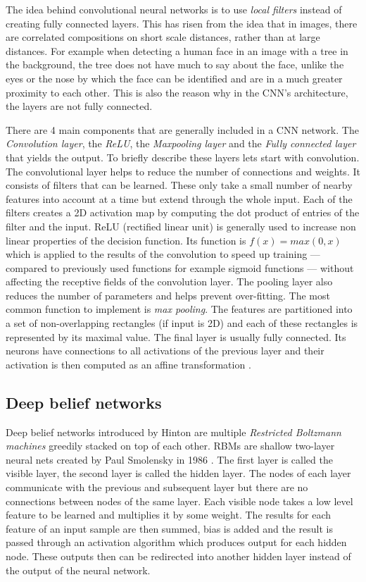The idea behind convolutional neural networks is to use \textit{local filters} instead of creating fully connected layers. This has risen from the idea that in images, there are correlated compositions on short scale distances, rather than at large distances. For example when detecting a human face in an image with a tree in the background, the tree does not have much to say about the face, unlike the eyes or the nose by which the face can be identified and are in a much greater proximity to each other. This is also the reason why in the CNN's architecture, the layers are not fully connected. 

There are 4 main components that are generally included in a CNN network. The \textit{Convolution layer}, the \textit{ReLU}, the \textit{Maxpooling layer} and the \textit{Fully connected layer} that yields the output. To briefly describe these layers lets start with convolution. The convolutional layer helps to reduce the number of connections and weights. It consists of filters that can be learned. These only take a small number of nearby features into account at a time but extend through the whole input. Each of the filters creates a 2D activation map by computing the dot product of entries of the filter and the input. ReLU (rectified linear unit) is generally used to increase non linear properties of the decision function. Its function is $ f(x) = max(0,x) $ which is applied to the results of the convolution to speed up training --- compared to previously used functions for example sigmoid functions --- without affecting the receptive fields of the convolution layer. The pooling layer also reduces the number of parameters and helps prevent over-fitting. The most common function to implement is \textit{max pooling}. The features are partitioned into a set of non-overlapping rectangles (if input is 2D) and each of these rectangles  is represented by its maximal value. 
The final layer is usually fully connected. Its neurons have connections to all activations of the previous layer and their activation is then computed as an affine transformation \cite{CNN_desription}. 

\subsection{Deep belief networks}
Deep belief networks introduced by Hinton \cite{Hinton504} are multiple \textit{Restricted Boltzmann machines} greedily stacked on top of each other. RBMs are shallow two-layer neural nets created by Paul Smolensky in 1986 \cite{Smolensky1986InformationPI}. The first layer is called the visible layer, the second layer is called the hidden layer. The nodes of each layer communicate with the previous and subsequent layer but there are no connections between nodes of the same layer. Each visible node takes a low level feature to be learned and multiplies it by some weight. The results for each feature of an input sample are then summed, bias is added and the result is passed through an activation algorithm which produces output for each hidden node. These outputs then can be redirected into another hidden layer instead of the output of the neural network. 

